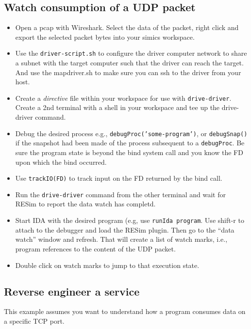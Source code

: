 \documentclass[titlepage]{article}
\begin{document}
\subsection{Watch consumption of a UDP packet}
\begin{itemize}
\item Open a pcap with Wireshark. Select the data of the packet, right click and export the selected packet bytes into your simics workspace.

\item Use the {\tt driver-script.sh} to configure the driver computer network to share a subnet with the target computer such that the driver
can reach the target.  And use the mapdriver.sh to make sure you can ssh to the driver from your host.

\item Create a \textit{directive} file within your workspace for use with {\tt drive-driver}.  Create a 2nd terminal with a shell in your workspace
and tee up the drive-driver command.

\item Debug the desired process e.g., {\tt debugProc('some-program')}, or {\tt debugSnap()} if the snapshot had been made of the process subsequent
to a {\tt debugProc}.  Be sure the program state is beyond the bind system call and you know the FD upon which the bind occurred.

\item Use {\tt trackIO(FD)} to track input on the FD returned by the bind call.
 
\item Run the {\tt drive-driver} command from the other terminal and wait for RESim to report the data watch has completd.

\item Start IDA with the desired program (e.g, use {\tt runIda program}.  Use shift-r to attach to the debugger and load the RESim plugin.
Then go to the ``data watch'' window and refresh.  That will create a list of watch marks, i.e., program references to the content of the UDP packet. 

\item Double click on  watch marks to jump to that execution state.

\end{itemize}

\subsection{Reverse engineer a service}
This example assumes you want to understand how a program consumes
data on a specific TCP port.
\end{document}

